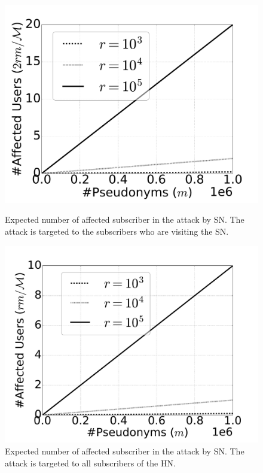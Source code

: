 \documentclass{llncs} %
\begin{document}
\begin{figure}[]
  \centering
  \begin{minipage}[b]{0.49\textwidth}
    \includegraphics[width=\textwidth]{expected_success_rate_attack_by_sn_insider.pdf}
   \caption{Expected number of affected subscriber in the attack by SN. The attack is targeted to the subscribers who are visiting the SN.}
\label{fig:expected_success_rate_attack_by_sn_insider}
  \end{minipage}
  \hfill
  \begin{minipage}[b]{0.49\textwidth}
    \includegraphics[width=\textwidth]{sn_attack_all.pdf}
    \caption{Expected number of affected subscriber in the attack by SN. The attack is targeted to all subscribers of the HN.}
  \label{fig:expected_success_rate_attack_all_by_sn}
  \end{minipage}
\end{figure}
\end{document}
